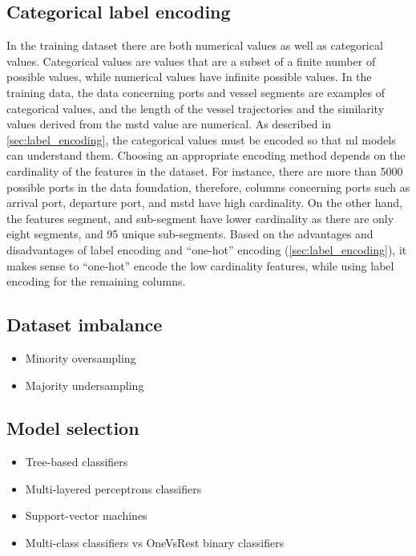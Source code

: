 \subsection{Categorical label encoding}

In the training dataset there are both numerical values as well as categorical values. Categorical values are values that are a subset of a finite number of possible values, while numerical values have infinite possible values. In the training data, the data concerning ports and vessel segments are examples of categorical values, and the length of the vessel trajectories and the similarity values derived from the \acrshort{mstd} value are numerical. As described in \cref{sec:label_encoding}, the categorical values must be encoded so that \acrshort{ml} models can understand them. Choosing an appropriate encoding method depends on the cardinality of the features in the dataset. For instance, there are more than 5000 possible ports in the data foundation, therefore, columns concerning ports such as arrival port, departure port, and \acrshort{mstd} have high cardinality. On the other hand, the features segment, and sub-segment have lower cardinality as there are only eight segments, and 95 unique sub-segments. Based on the advantages and disadvantages of label encoding and ``one-hot'' encoding (\cref{sec:label_encoding}), it makes sense to ``one-hot'' encode the low cardinality features, while using label encoding for the remaining columns.

\subsection{Dataset imbalance}

\begin{itemize}
    \item Minority oversampling
    \item Majority undersampling
\end{itemize}

\subsection{Model selection}

\begin{itemize}
    \item Tree-based classifiers
    \item Multi-layered perceptrons classifiers
    \item Support-vector machines
    \item Multi-class classifiers vs OneVsRest binary classifiers
\end{itemize}

